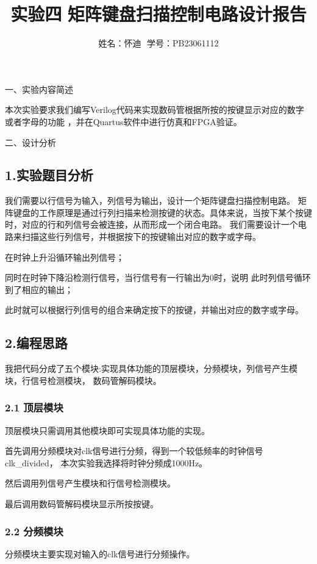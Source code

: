 \documentclass[12pt]{article}
\title{实验四\,\,矩阵键盘扫描控制电路设计报告}
\author{姓名：怀迪\,\, 学号：PB23061112 \\ }
\date{}
\begin{document}
\maketitle

\begin{highlightedsection}{}
    一、实验内容简述
\end{highlightedsection}
本次实验要求我们编写Verilog代码来实现数码管根据所按的按键显示对应的数字或者字母的功能
，并在Quartus软件中进行仿真和FPGA验证。


\begin{highlightedsection}{}
    二、设计分析
\end{highlightedsection}
\subsection*{1.实验题目分析}
我们需要以行信号为输入，列信号为输出，设计一个矩阵键盘扫描控制电路。
矩阵键盘的工作原理是通过行列扫描来检测按键的状态。具体来说，当按下某个按键时，对应的行和列信号会被连接，从而形成一个闭合电路。
我们需要设计一个电路来扫描这些行列信号，并根据按下的按键输出对应的数字或字母。

在时钟上升沿循环输出列信号；

同时在时钟下降沿检测行信号，当行信号有一行输出为0时，说明
此时列信号循环到了相应的输出；

此时就可以根据行列信号的组合来确定按下的按键，并输出对应的数字或字母。

\subsection*{2.编程思路}
我把代码分成了五个模块:实现具体功能的顶层模块，分频模块，列信号产生模块，行信号检测模块，
数码管解码模块。
\subsubsection*{2.1 顶层模块}
顶层模块只需调用其他模块即可实现具体功能的实现。

首先调用分频模块对clk信号进行分频，得到一个较低频率的时钟信号clk\_divided，
本次实验我选择将时钟分频成1000Hz。

然后调用列信号产生模块和行信号检测模块。

最后调用数码管解码模块显示所按按键。

\subsubsection*{2.2 分频模块}
分频模块主要实现对输入的clk信号进行分频操作。
\end{document}
